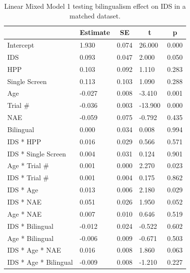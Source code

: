 \documentclass[english,,man,floatsintext]{apa6}
\begin{document}
\begin{table}[tbp]

\begin{center}
\begin{threeparttable}

\caption{\label{tab:unnamed-chunk-8}Linear Mixed Model 1 testing bilingualism effect on IDS in a matched dataset.}

\begin{tabular}{lllll}
\toprule
 & \multicolumn{1}{c}{Estimate} & \multicolumn{1}{c}{SE} & \multicolumn{1}{c}{t} & \multicolumn{1}{c}{p}\\
\midrule
Intercept & 1.930 & 0.074 & 26.000 & 0.000\\
IDS & 0.093 & 0.047 & 2.000 & 0.050\\
HPP & 0.103 & 0.092 & 1.110 & 0.283\\
Single Screen & 0.113 & 0.103 & 1.090 & 0.288\\
Age & -0.027 & 0.008 & -3.410 & 0.001\\
Trial \# & -0.036 & 0.003 & -13.900 & 0.000\\
NAE & -0.059 & 0.075 & -0.792 & 0.435\\
Bilingual & 0.000 & 0.034 & 0.008 & 0.994\\
IDS * HPP & 0.016 & 0.029 & 0.566 & 0.571\\
IDS * Single Screen & 0.004 & 0.031 & 0.124 & 0.901\\
Age * Trial \# & 0.001 & 0.000 & 2.270 & 0.023\\
IDS * Trial \# & 0.001 & 0.004 & 0.175 & 0.862\\
IDS * Age & 0.013 & 0.006 & 2.180 & 0.029\\
IDS * NAE & 0.051 & 0.026 & 1.950 & 0.052\\
Age * NAE & 0.007 & 0.010 & 0.646 & 0.519\\
IDS * Bilingual & -0.012 & 0.024 & -0.522 & 0.602\\
Age * Bilingual & -0.006 & 0.009 & -0.671 & 0.503\\
IDS * Age * NAE & 0.016 & 0.008 & 1.860 & 0.063\\
IDS * Age * Bilingual & -0.009 & 0.008 & -1.210 & 0.227\\
\bottomrule
\end{tabular}

\end{threeparttable}
\end{center}

\end{table}
\end{document}
